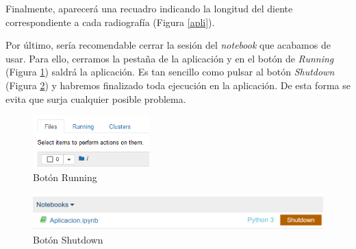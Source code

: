 Finalmente, aparecerá una recuadro indicando la longitud del diente correspondiente a cada radiografía (Figura \ref{apli}).

Por último, sería recomendable cerrar la sesión del \emph{notebook} que acabamos de usar. Para ello, cerramos la pestaña de la aplicación y en el botón de \emph{Running} (Figura \ref{f:running}) saldrá la aplicación. Es tan sencillo como pulsar al botón \emph{Shutdown} (Figura \ref{f:shutdown}) y habremos finalizado toda ejecución en la aplicación. De esta forma se evita que surja cualquier posible problema.

\begin{figure}[h]
 \centering
  \includegraphics[width=0.4\textwidth]{img/Gamma3.PNG}
 \caption{Botón Running}
 \label{f:running}
\end{figure}

\begin{figure}[h]
 \centering
  \includegraphics[width=1\textwidth]{img/Gamma4.PNG}
 \caption{Botón Shutdown}
 \label{f:shutdown}
\end{figure}